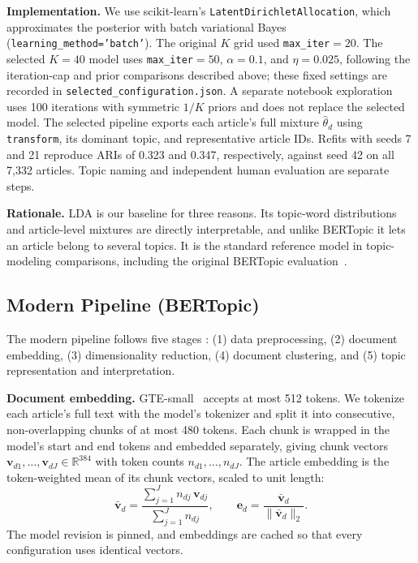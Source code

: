 \documentclass[conference]{IEEEtran}
\begin{document}
\textbf{Implementation.} We use scikit-learn's \texttt{LatentDirichletAllocation}, which approximates the posterior with batch variational Bayes (\texttt{learning\_method='batch'}). The original $K$ grid used \texttt{max\_iter}$=20$. The selected $K=40$ model uses \texttt{max\_iter}$=50$, $\alpha=0.1$, and $\eta=0.025$, following the iteration-cap and prior comparisons described above; these fixed settings are recorded in \texttt{selected\_configuration.json}. A separate notebook exploration uses 100 iterations with symmetric $1/K$ priors and does not replace the selected model. The selected pipeline exports each article's full mixture $\hat{\theta}_d$ using \texttt{transform}, its dominant topic, and representative article IDs. Refits with seeds 7 and 21 reproduce ARIs of 0.323 and 0.347, respectively, against seed 42 on all 7,332 articles. Topic naming and independent human evaluation are separate steps.

\textbf{Rationale.} LDA is our baseline for three reasons. Its topic-word distributions and article-level mixtures are directly interpretable, and unlike BERTopic it lets an article belong to several topics. It is the standard reference model in topic-modeling comparisons, including the original BERTopic evaluation~\cite{grootendorst2022bertopic}.

\subsection*{Modern Pipeline (BERTopic)}
The modern pipeline follows five stages \cite{alammar2024, kumari2026}: (1) data preprocessing, (2) document embedding, (3) dimensionality reduction, (4) document clustering, and (5) topic representation and interpretation.

\textbf{Document embedding.} GTE-small~\cite{li2023gte} accepts at most 512 tokens. We tokenize each article's full text with the model's tokenizer and split it into consecutive, non-overlapping chunks of at most 480 tokens. Each chunk is wrapped in the model's start and end tokens and embedded separately, giving chunk vectors $\mathbf{v}_{d1},\dots,\mathbf{v}_{dJ}\in\mathbb{R}^{384}$ with token counts $n_{d1},\dots,n_{dJ}$. The article embedding is the token-weighted mean of its chunk vectors, scaled to unit length:
\begin{equation}
\bar{\mathbf{v}}_d = \frac{\sum_{j=1}^{J} n_{dj}\,\mathbf{v}_{dj}}{\sum_{j=1}^{J} n_{dj}}, \qquad
\mathbf{e}_d = \frac{\bar{\mathbf{v}}_d}{\lVert\bar{\mathbf{v}}_d\rVert_2}.
\label{eq:pooling}
\end{equation}
The model revision is pinned, and embeddings are cached so that every configuration uses identical vectors.
\end{document}
